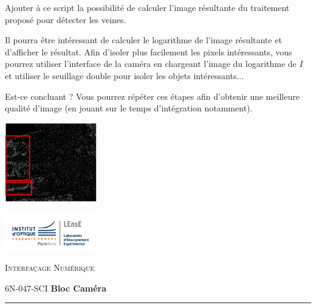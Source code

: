 \documentclass[a4paper,11pt,titlepage]{article} %
\begin{document}
\Manip Ajouter à ce script la possibilité de calculer l'image résultante du traitement proposé pour détecter les veines.

Il pourra être intéressant de calculer le logarithme de l'image résultante et d'afficher le résultat. Afin d'isoler plus facilement les pixels intéressants, vous pourrez utiliser l'interface de la caméra en chargeant l'image du logarithme de $I$ et utiliser le seuillage double pour isoler les objets intéressants...

\Quest Est-ce concluant ? Vous pourrez répéter ces étapes afin d'obtenir une meilleure qualité d'image (en jouant sur le temps d'intégration notamment).

\begin{center}
	\includegraphics[width=0.3\textwidth]{images/blood_detect.png}
\end{center}




\newpage
\strut %
\begin{minipage}[c]{.25\linewidth}
	\includegraphics[width=4cm]{images/Logo-LEnsE.png}
\end{minipage} \hfill
\begin{minipage}[c]{.4\linewidth}

\begin{center}
\vspace{0.3cm}
{\Large \textsc{Interfaçage Numérique}}

\medskip

6N-047-SCI \qquad \textbf{\Large Bloc Caméra}

\end{center}
\end{minipage}\hfill

\vspace{0.5cm}

\noindent \rule{\linewidth}{1pt}
\end{document}
